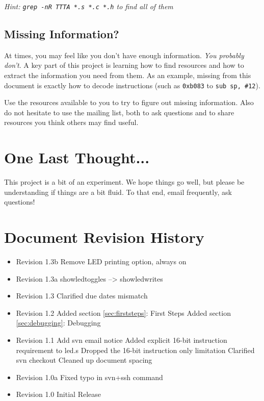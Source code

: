 \documentclass{article}
\begin{document}
\vspace{5mm}

{\em Hint: {\tt grep -nR TTTA *.s *.c *.h} to find all of them}

\subsection{Missing Information?}
\label{sec:missing}
At times, you may feel like you don't have enough information. {\em You
probably don't}. A key part of this project is learning how to find resources
and how to extract the information you need from them. As an example, missing
from this document is exactly how to decode instructions (such as {\tt 0xb083}
to {\tt sub sp, \#12}).

Use the resources available to you to try to figure out missing information.
Also do not hesitate to use the mailing list, both to ask questions and to
share resources you think others may find useful.

\section{One Last Thought...}
This project is a bit of an experiment. We hope things go well, but please be
understanding if things are a bit fluid. To that end, email frequently, ask
questions!

\pagebreak

\section{Document Revision History}

\begin{itemize}

\item Revision 1.3b
\subitem Remove LED printing option, always on

\item Revision 1.3a
\subitem showledtoggles --> showledwrites

\item Revision 1.3
\subitem Clarified due dates mismatch

\item Revision 1.2
\subitem Added section \ref{sec:firststeps}: First Steps
\subitem Added section \ref{sec:debugging}: Debugging

\item Revision 1.1
\subitem Add svn email notice
\subitem Added explicit 16-bit instruction requirement to led.s
\subitem Dropped the 16-bit instruction only limitation
\subitem Clarified svn checkout
\subitem Cleaned up document spacing

\item Revision 1.0a
\subitem Fixed typo in svn+ssh command

\item Revision 1.0
\subitem Initial Release

\end{itemize}
\end{document}
